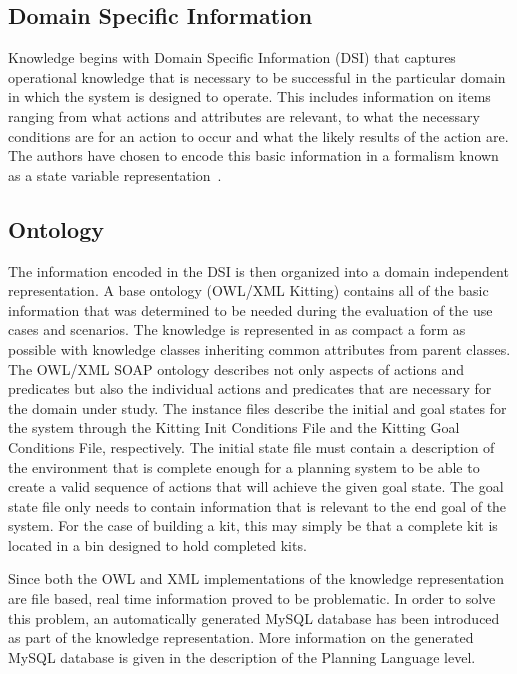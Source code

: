 \subsection{Domain Specific Information}
Knowledge begins with Domain Specific Information
(DSI) that captures operational knowledge that is necessary to be
successful in the particular domain in which the system is designed to
operate. This includes information on items ranging from what actions and
attributes are relevant, to what the necessary conditions are for an action
to occur and what the likely results of the action are. The authors have
chosen to encode this basic information in a formalism known as a state
variable representation~\cite{NAU.2004}.

\subsection{Ontology}
\label{sub:ontology}
The information encoded in the DSI is then organized into a domain
independent representation. A base ontology (\textsf{OWL/XML Kitting})
contains all of the basic information that was determined to be needed
during the evaluation of the use cases and scenarios. The knowledge is
represented in as compact a form as possible with knowledge classes
inheriting common attributes from parent classes. The \textsf{OWL/XML SOAP}
ontology describes not only aspects of actions and predicates but also the
individual actions and predicates that are necessary for the domain under
study. The instance files describe the initial and goal states for the
system through the \textsf{Kitting Init Conditions File} and the
\textsf{Kitting Goal Conditions File}, respectively. The initial state file
must contain a description of the environment that is complete enough for a
planning system to be able to create a valid sequence of actions that will
achieve the given goal state. The goal state file only needs to contain
information that is relevant to the end goal of the system. For the case of building a kit, this may simply be that a complete kit is located in a bin designed to hold completed kits.

Since both the OWL and XML implementations of the knowledge representation are file based, real time information proved to be problematic. In order to solve this problem, an automatically generated MySQL database has been introduced as part of the knowledge representation. More information on the generated MySQL database is given in the description of the Planning Language level.


